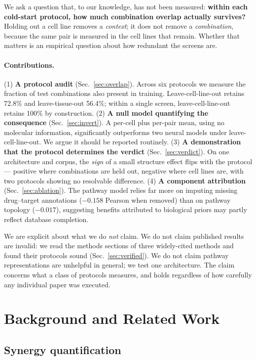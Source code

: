 \documentclass{ws-procs11x85}
\begin{document}
We ask a question that, to our knowledge, has not been measured: \textbf{within
each cold-start protocol, how much combination overlap actually survives?}
Holding out a cell line removes a \emph{context}; it does not remove a
\emph{combination}, because the same pair is measured in the cell lines that
remain. Whether that matters is an empirical question about how redundant the
screens are.

\paragraph{Contributions.}
(1) \textbf{A protocol audit} (Sec.~\ref{sec:overlap}). Across six protocols we
measure the fraction of test combinations also present in training.
Leave-cell-line-out retains 72.8\% and leave-tissue-out 56.4\%; within a single
screen, leave-cell-line-out retains 100\% by construction.
(2) \textbf{A null model quantifying the consequence} (Sec.~\ref{sec:invert}). A
per-cell plus per-pair mean, using no molecular information, significantly
outperforms two neural models under leave-cell-line-out. We argue it should be
reported routinely.
(3) \textbf{A demonstration that the protocol determines the verdict}
(Sec.~\ref{sec:verdict}). On one architecture and corpus, the \emph{sign} of a
small structure effect flips with the protocol --- positive where combinations
are held out, negative where cell lines are, with two protocols showing no
resolvable difference.
(4) \textbf{A component attribution} (Sec.~\ref{sec:ablation}). The pathway model
relies far more on imputing missing drug--target annotations ($-0.158$ Pearson
when removed) than on pathway topology ($-0.017$), suggesting benefits attributed
to biological priors may partly reflect database completion.

We are explicit about what we do \emph{not} claim. We do not claim published
results are invalid: we read the methods sections of three widely-cited methods
and found their protocols sound (Sec.~\ref{sec:verified}). We do not claim
pathway representations are unhelpful in general; we test one architecture. The
claim concerns what a class of protocols measures, and holds regardless of how
carefully any individual paper was executed.

\section{Background and Related Work}

\subsection{Synergy quantification}
\end{document}
